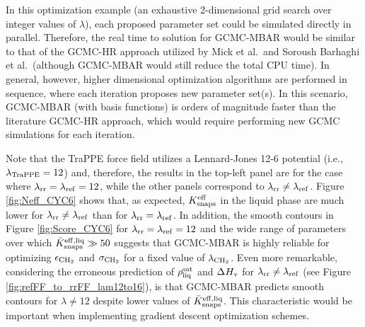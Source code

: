 \documentclass[journal=jced,manuscript=article]{achemso}
\begin{document}

In this optimization example (an exhaustive 2-dimensional grid search over integer values of $\lambda$), each proposed parameter set could be simulated directly in parallel. Therefore, the real time to solution for GCMC-MBAR would be similar to that of the GCMC-HR approach utilized by Mick et al.~and Soroush Barhaghi et al.~(although GCMC-MBAR would still reduce the total CPU time). In general, however, higher dimensional optimization algorithms are performed in sequence, where each iteration proposes new parameter set(s). In this scenario, GCMC-MBAR (with basis functions) is orders of magnitude faster than the literature GCMC-HR approach, which would require performing new GCMC simulations for each iteration. 



Note that the TraPPE force field utilizes a Lennard-Jones 12-6 potential (i.e., $\lambda_{\rm TraPPE} = 12$) and, therefore, the results in the top-left panel are for the case where $\lambda_{\rm rr} = \lambda_{\rm ref} = 12$, while the other panels correspond to $\lambda_{\rm rr} \neq \lambda_{\rm ref}$. Figure \ref{fig:Neff_CYC6} shows that, as expected, $K_{\rm snaps}^{\rm eff}$ in the liquid phase are much lower for $\lambda_{\rm rr} \neq \lambda_{\rm ref}$ than for $\lambda_{\rm rr} = \lambda_{\rm ref}$. In addition, the smooth contours in Figure \ref{fig:Score_CYC6} for $\lambda_{\rm rr} = \lambda_{\rm ref} = 12$ and the wide range of parameters over which $\bar K_{\rm snaps}^{\rm eff, liq} \gg 50$ suggests that GCMC-MBAR is highly reliable for optimizing $\epsilon_{\rm CH_2}$ and $\sigma_{\rm CH_2}$ for a fixed value of $\lambda_{\rm CH_2}$. 
Even more remarkable, considering the erroneous prediction of $\rho_{\rm liq}^{\rm sat}$ and $\Delta H_{\rm v}$ for $\lambda_{\rm rr} \neq \lambda_{\rm ref}$ (see Figure \ref{fig:refFF_to_rrFF_lam12to16}), is that GCMC-MBAR predicts smooth contours for $\lambda \neq 12$ despite lower values of $\bar K_{\rm snaps}^{\rm eff, liq}$. This characteristic would be important when implementing gradient descent optimization schemes.     
\end{document}
